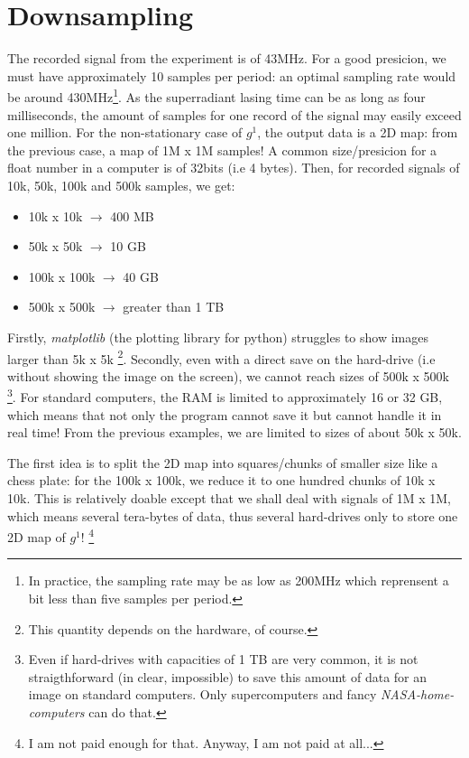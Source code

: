 \documentclass[10pt]{report}
\begin{document}
\section{Downsampling}

The recorded signal from the experiment is of 43MHz. For a good presicion, we must have approximately 10 samples per period: an optimal sampling rate would be around 430MHz\footnote{In practice, the sampling rate may be as low as 200MHz which reprensent a bit less than five samples per period.}. As the superradiant lasing time can be as long as four milliseconds, the amount of samples for one record of the signal may easily exceed one million. For the non-stationary case of $g^1$, the output data is a 2D map: from the previous case, a map of 1M x 1M samples! A common size/presicion for a float number in a computer is of 32bits (i.e 4 bytes). Then, for recorded signals of 10k, 50k, 100k and 500k samples, we get:
\begin{itemize}
	\item 10k x 10k $\rightarrow$ 400 MB
	\item 50k x 50k $\rightarrow$ 10 GB
	\item 100k x 100k $\rightarrow$ 40 GB
	\item 500k x 500k $\rightarrow$ greater than 1 TB
\end{itemize}
Firstly, \textit{matplotlib} (the plotting library for python) struggles to show images larger than 5k x 5k \footnote{This quantity depends on the hardware, of course.}. Secondly, even with a direct save on the hard-drive (i.e without showing the image on the screen), we cannot reach sizes of 500k x 500k \footnote{Even if hard-drives with capacities of 1 TB are very common, it is not straigthforward (in clear, impossible) to save this amount of data for an image on standard computers. Only supercomputers and fancy \textit{NASA-home-computers} can do that.}. For standard computers, the RAM is limited to approximately 16 or 32 GB, which means that not only the program cannot save it but cannot handle it in real time! From the previous examples, we are limited to sizes of about 50k x 50k.

The first idea is to split the 2D map into squares/chunks of smaller size like a chess plate: for the 100k x 100k, we reduce it to one hundred chunks of 10k x 10k. This is relatively doable except that we shall deal with signals of 1M x 1M, which means several tera-bytes of data, thus several hard-drives only to store one 2D map of $g^1$! \footnote{I am not paid enough for that. Anyway, I am not paid at all...}
\end{document}
